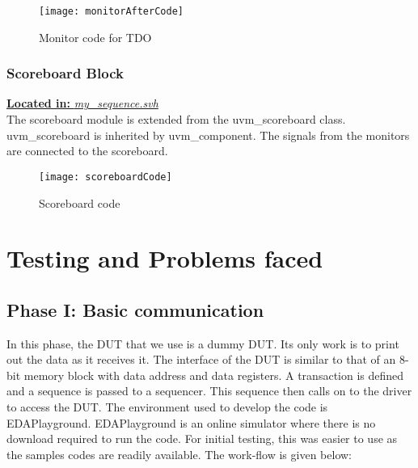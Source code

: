 \documentclass[a4paper,11pt]{article}
\begin{document}
\begin{figure}[ht]
\centering
\texttt{[image: monitorAfterCode]}
\caption{Monitor code for TDO}
\end{figure}

\FloatBarrier
\subsubsection{Scoreboard Block}
\underline{\textbf{Located in:} \textit{my\_sequence.svh}}\\

The scoreboard module is extended from the uvm\_scoreboard class. uvm\_scoreboard is inherited by uvm\_component. The signals from the monitors are connected to the scoreboard.
\begin{figure}[ht]
\centering
\texttt{[image: scoreboardCode]}
\caption{Scoreboard code}
\end{figure}




\FloatBarrier
\newpage
\pagebreak

\section{Testing and Problems faced}
\subsection{Phase I: Basic communication}
In this phase, the DUT that we use is a dummy DUT. Its only work is to print out the data as it receives it. The interface of the DUT is similar to that of an 8-bit memory block with data address and data registers. A transaction is defined and a sequence is passed to a sequencer. This sequence then calls on to the driver to access the DUT. The environment used to develop the code is EDAPlayground. EDAPlayground is an online simulator where there is no download required to run the code. For initial testing, this was easier to use as the samples codes are readily available.  
The work-flow is given below:
\end{document}
